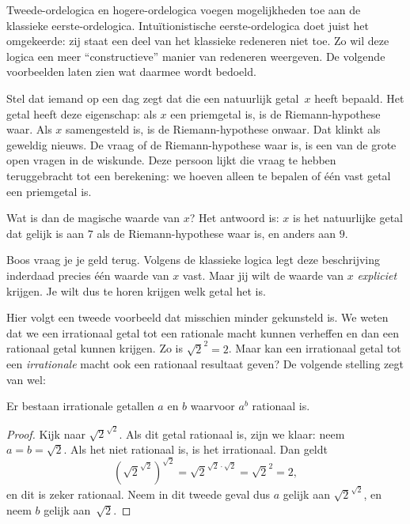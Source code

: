 \documentclass[../../../include/open-logic-section]{subfiles}
\begin{document}


Tweede-ordelogica en hogere-ordelogica voegen mogelijkheden toe aan de klassieke
eerste-ordelogica. Intuïtionistische eerste-ordelogica doet juist het omgekeerde:
zij staat een deel van het klassieke redeneren niet toe. Zo wil deze logica een
meer ``constructieve'' manier van redeneren weergeven. De volgende voorbeelden
laten zien wat daarmee wordt bedoeld.

Stel dat iemand op een dag zegt dat die een natuurlijk getal~$x$ heeft bepaald.
Het getal heeft deze eigenschap: als $x$ een priemgetal is, is de
Riemann-hypothese waar. Als $x$ samengesteld is, is de Riemann-hypothese onwaar.
Dat klinkt als geweldig nieuws. De vraag of de Riemann-hypothese waar is, is een
van de grote open vragen in de wiskunde. Deze persoon lijkt die vraag te hebben
teruggebracht tot een berekening: we hoeven alleen te bepalen of één vast getal
een priemgetal is.

Wat is dan de magische waarde van $x$? Het antwoord is: $x$ is het natuurlijke
getal dat gelijk is aan $7$ als de Riemann-hypothese waar is, en anders aan $9$.

Boos vraag je je geld terug. Volgens de klassieke logica legt deze beschrijving
inderdaad precies één waarde van $x$ vast. Maar jij wilt de waarde van $x$
\emph{expliciet} krijgen. Je wilt dus te horen krijgen welk getal het is.

Hier volgt een tweede voorbeeld dat misschien minder gekunsteld is. We weten dat
we een irrationaal getal tot een rationale macht kunnen verheffen en dan een
rationaal getal kunnen krijgen. Zo is $\sqrt{2}^2 = 2$. Maar kan een irrationaal
getal tot een \emph{irrationale} macht ook een rationaal resultaat geven? De
volgende stelling zegt van wel:

\begin{thm}
Er bestaan irrationale getallen $a$ en $b$ waarvoor $a^b$ rationaal is.
\end{thm}

\begin{proof}
Kijk naar $\sqrt{2}^{\sqrt{2}}$. Als dit getal rationaal is, zijn we klaar: neem
$a = b = \sqrt{2}$. Als het niet rationaal is, is het irrationaal. Dan geldt
\[
(\sqrt{2}^{\sqrt{2}})^{\sqrt{2}} = \sqrt{2}^{\sqrt{2} \cdot
  \sqrt{2}} = \sqrt{2}^2 = 2,
\]
en dit is zeker rationaal. Neem in dit tweede geval dus $a$ gelijk aan
$\sqrt{2}^{\sqrt{2}}$, en neem $b$ gelijk aan~$\sqrt 2$.
\end{proof}
\end{document}
